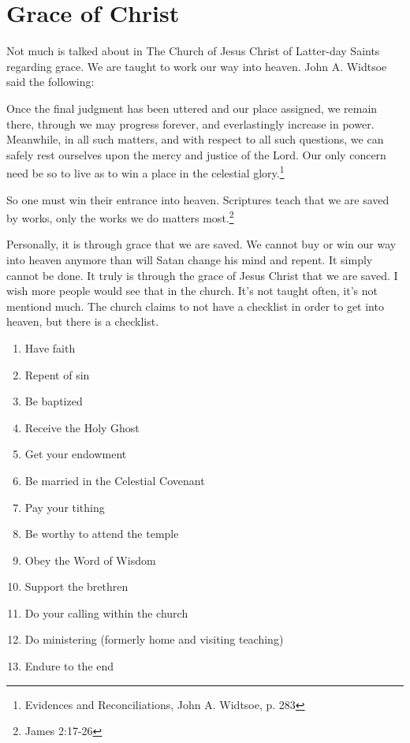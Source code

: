\chapter{Grace of Christ}

Not much is talked about in The Church of Jesus Christ of Latter-day Saints regarding
grace. We are taught to work our way into heaven. John A. Widtsoe said the following:

\begin{displayquote}
Once the final judgment has been uttered and our place assigned, we remain there,
through we may progress forever, and everlastingly increase in power. Meanwhile, in
all such matters, and with respect to all such questions, we can safely rest
ourselves upon the mercy and justice of the Lord. Our only concern need be so to live
as to win a place in the celestial glory.\footnote{Evidences and Reconciliations, 
John A. Widtsoe, p. 283}
\end{displayquote}

So one must win their entrance into heaven. Scriptures teach that we are saved by
works, only the works we do matters most.\footnote{James 2:17-26}

Personally, it is through grace that we are saved. We cannot buy or win our way into
heaven anymore than will Satan change his mind and repent. It simply cannot be done.
It truly is through the grace of Jesus Christ that we are saved. I wish more people
would see that in the church. It's not taught often, it's not mentiond much. The
church claims to not have a checklist in order to get into heaven, but there is a
checklist.

\begin{enumerate}
\item Have faith
\item Repent of sin
\item Be baptized
\item Receive the Holy Ghost
\item Get your endowment
\item Be married in the Celestial Covenant
\item Pay your tithing
\item Be worthy to attend the temple
\item Obey the Word of Wisdom
\item Support the brethren
\item Do your calling within the church
\item Do ministering (formerly home and visiting teaching)
\item Endure to the end
\end{enumerate}


